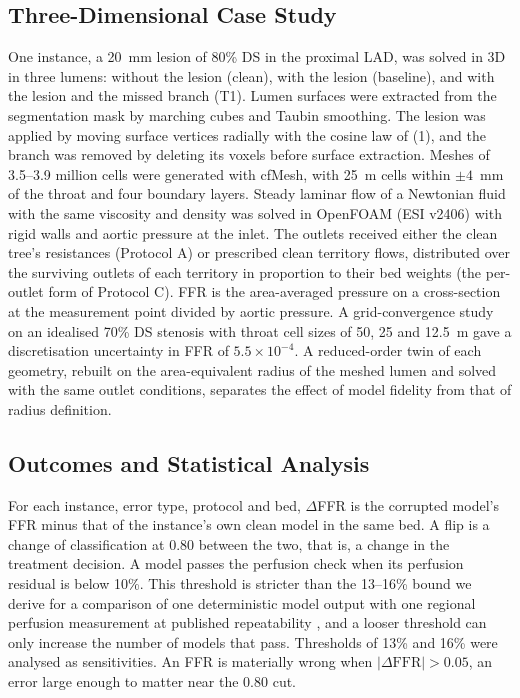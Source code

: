 \documentclass[journal]{IEEEtran}
\begin{document}
\subsection{Three-Dimensional Case Study}
One instance, a 20~mm lesion of 80\% DS in the proximal LAD, was solved in 3D in three lumens: without the lesion
(clean), with the lesion (baseline), and with the lesion and the missed branch (T1). Lumen surfaces were extracted
from the segmentation mask by marching cubes and Taubin smoothing. The lesion was applied by moving surface vertices
radially with the cosine law of (1), and the branch was removed by deleting its voxels before surface extraction.
Meshes of 3.5--3.9 million cells were generated with cfMesh, with 25~\textmu m cells within $\pm 4$~mm of the throat
and four boundary layers. Steady laminar flow of a Newtonian fluid with the same viscosity and density was solved in
OpenFOAM (ESI v2406) with rigid walls and aortic pressure at the inlet. The outlets received either the clean tree's
resistances (Protocol A) or prescribed clean territory flows, distributed over the surviving outlets of each
territory in proportion to their bed weights (the per-outlet form of Protocol C). FFR is the area-averaged pressure
on a cross-section at the measurement point divided by aortic pressure. A grid-convergence study on an idealised
70\% DS stenosis with throat cell sizes of 50, 25 and 12.5~\textmu m gave a discretisation uncertainty in FFR of
$5.5\times10^{-4}$. A reduced-order twin of each geometry, rebuilt on the area-equivalent radius of the meshed lumen
and solved with the same outlet conditions, separates the effect of model fidelity from that of radius definition.

\subsection{Outcomes and Statistical Analysis}
For each instance, error type, protocol and bed, $\Delta$FFR is the corrupted model's FFR minus that of the
instance's own clean model in the same bed. A flip is a change of classification at 0.80 between the two, that is,
a change in the treatment decision. A model passes the perfusion check when its perfusion residual is below 10\%.
This threshold is stricter than the 13--16\% bound we derive for a comparison of one deterministic model output
with one regional perfusion measurement at published repeatability \cite{schindler2023,brown2018}, and a looser
threshold can only increase the number of models that pass. Thresholds of 13\% and 16\% were analysed as
sensitivities. An FFR is materially wrong when $|\Delta\mathrm{FFR}| > 0.05$, an error large enough to matter near
the 0.80 cut.
\end{document}
